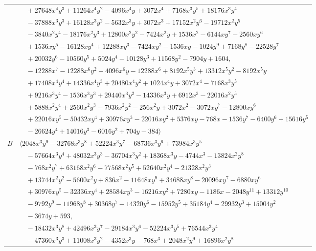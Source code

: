 \documentclass[11pt]{article}
\begin{document}
\begin{longtable}{@{}ll@{}}
 & $\quad +27648x^{4}y^{3}+11264x^{4}y^{2}-4096x^{4}y+3072x^{4}+7168x^{3}y^{5}+18176x^{3}y^{4}$\\
 & $\quad -37888x^{3}y^{3}+16128x^{3}y^{2}-5632x^{3}y+3072x^{3}+17152x^{2}y^{6}-19712x^{2}y^{5}$\\
 & $\quad -3840x^{2}y^{4}-18176x^{2}y^{3}+12800x^{2}y^{2}-7424x^{2}y+1536x^{2}-6144xy^{7}-2560xy^{6}$\\
 & $\quad +1536xy^{5}-16128xy^{4}+12288xy^{3}-7424xy^{2}-1536xy-1024y^{9}+7168y^{8}-22528y^{7}$\\
 & $\quad +20032y^{6}-10560y^{5}+5024y^{4}-10128y^{3}+11568y^{2}-7904y+1604,$\\
 & $\quad -12288x^{7}-12288x^{6}y^{2}-4096x^{6}y-12288x^{6}+8192x^{5}y^{3}+13312x^{5}y^{2}-8192x^{5}y$\\
 & $\quad +17408x^{4}y^{4}+14336x^{4}y^{3}+20480x^{4}y^{2}+1024x^{4}y+3072x^{4}-7168x^{3}y^{5}$\\
 & $\quad +9216x^{3}y^{4}-1536x^{3}y^{3}+29440x^{3}y^{2}-14336x^{3}y+6912x^{3}-22016x^{2}y^{5}$\\
 & $\quad +5888x^{2}y^{4}+2560x^{2}y^{3}-7936x^{2}y^{2}-256x^{2}y+3072x^{2}-3072xy^{7}-12800xy^{6}$\\
 & $\quad +22016xy^{5}-50432xy^{4}+30976xy^{3}-22016xy^{2}+5376xy-768x-1536y^{7}-6400y^{6}+15616y^{5}$\\
 & $\quad -26624y^{4}+14016y^{3}-6016y^{2}+704y-384\rangle$\\
$B$ & $\langle 2048x^{3}y^{9}-32768x^{3}y^{8}+52224x^{3}y^{7}-68736x^{3}y^{6}+73984x^{3}y^{5}$\\
 & $\quad -57664x^{3}y^{4}+48032x^{3}y^{3}-36704x^{3}y^{2}+18368x^{3}y-4744x^{3}-13824x^{2}y^{8}$\\
 & $\quad -768x^{2}y^{7}+63168x^{2}y^{6}-77568x^{2}y^{5}+52640x^{2}y^{4}-21328x^{2}y^{3}$\\
 & $\quad +13744x^{2}y^{2}-5600x^{2}y+836x^{2}-11648xy^{9}+34688xy^{8}-20096xy^{7}-6880xy^{6}$\\
 & $\quad +30976xy^{5}-32336xy^{4}+28584xy^{3}-16216xy^{2}+7280xy-1186x-2048y^{11}+13312y^{10}$\\
 & $\quad -9792y^{9}-11968y^{8}+30368y^{7}-14320y^{6}-15952y^{5}+35184y^{4}-29932y^{3}+15004y^{2}$\\
 & $\quad -3674y+593,$\\
 & $\quad -18432x^{3}y^{8}+42496x^{3}y^{7}-29184x^{3}y^{6}-52224x^{3}y^{5}+76544x^{3}y^{4}$\\
 & $\quad -47360x^{3}y^{3}+11008x^{3}y^{2}-4352x^{3}y-768x^{3}+2048x^{2}y^{9}+16896x^{2}y^{8}$\\

\end{longtable}
\end{document}

